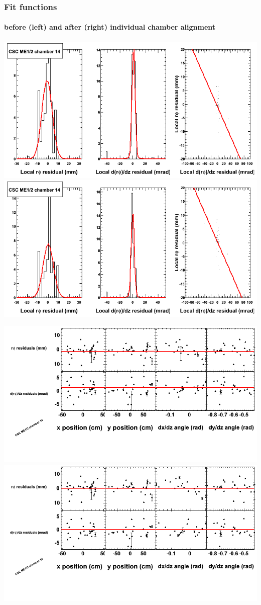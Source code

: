 \documentclass[compress]{beamer}
\begin{document}
\begin{frame}
\frametitle{Fit functions}
\framesubtitle{before (left) and after (right) individual chamber alignment}
\includegraphics[width=0.5\linewidth]{ringfits_3dof/beforefit_MEp12_14_bellcurve.png} \includegraphics[width=0.5\linewidth]{ringfits_3dof/afterfit_MEp12_14_bellcurve.png}

\includegraphics[width=0.5\linewidth]{ringfits_3dof/beforefit_MEp12_14_polynomials.png} \includegraphics[width=0.5\linewidth]{ringfits_3dof/afterfit_MEp12_14_polynomials.png}
\end{frame}
\end{document}
